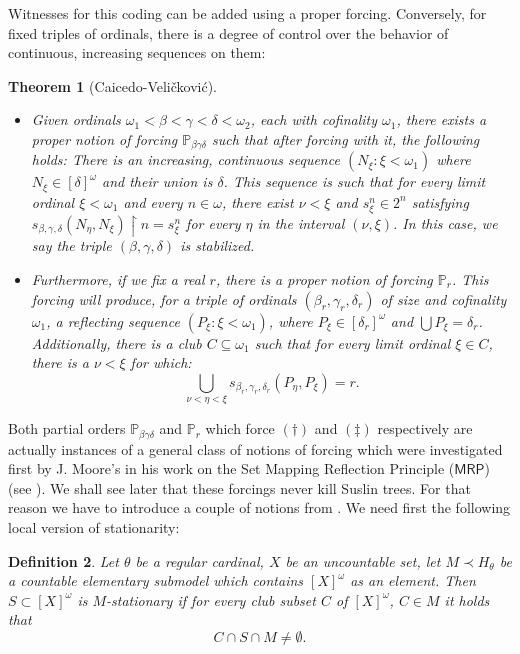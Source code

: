 \documentclass[a4paper,11pt]{article}
\newtheorem{theorem}{Theorem}[section]
\newtheorem{definition}[theorem]{Definition}
\newcommand{\forceP}{\mathbb{P}}
\newcommand{\MRP}{\mathsf{MRP}}
\begin{document}
Witnesses for this coding can be added using a proper forcing. Conversely, for fixed triples of ordinals, there is a degree of control over the behavior of continuous, increasing sequences on them:

\begin{theorem}[Caicedo-Veli\v{c}kovi\'{c}]
\begin{itemize}
\item[$(\dagger)$] Given ordinals $\omega_1 < \beta < \gamma < \delta < \omega_2$, each with cofinality $\omega_1$, there exists a proper notion of forcing $\forceP_{\beta \gamma \delta}$ such that after forcing with it, the following holds: There is an increasing, continuous sequence $(N_{\xi} : \xi < \omega_1)$ where $N_{\xi} \in [\delta]^{\omega}$ and their union is $\delta$. This sequence is such that for every limit ordinal $\xi < \omega_1$ and every $n \in \omega$, there exist $\nu < \xi$ and $s_{\xi}^n \in 2^n$ satisfying $s_{\beta, \gamma, \delta}(N_{\eta}, N_{\xi}) \restriction n = s_{\xi}^{n}$ for every $\eta$ in the interval $(\nu, \xi)$. In this case, we say the triple $(\beta, \gamma, \delta)$ is stabilized.

\item[$(\ddagger)$] Furthermore, if we fix a real $r$, there is a proper notion of forcing $\forceP_r$. This forcing will produce, for a triple of ordinals $(\beta_r, \gamma_r, \delta_r)$ of size and cofinality $\omega_1$, a reflecting sequence $(P_{\xi} : \xi < \omega_1)$, where $P_{\xi} \in [\delta_r]^{\omega}$ and $\bigcup P_{\xi} = \delta_r$. Additionally, there is a club $C \subseteq \omega_1$ such that for every limit ordinal $\xi \in C$, there is a $\nu < \xi$ for which:
    $$\bigcup_{\nu < \eta < \xi} s_{\beta_r, \gamma_r, \delta_r} (P_{\eta}, P_{\xi}) = r.$$
\end{itemize}
\end{theorem}

Both partial orders $\forceP_{\beta \gamma \delta}$ and $\forceP_{r}$ which force $(\dagger)$ and $(\ddagger)$ respectively are actually instances of a general class of notions of forcing which were investigated first by J. Moore's in his work on the Set Mapping Reflection Principle ($\MRP$) (see \cite{Moore}). We shall see later that these forcings never kill Suslin trees. For that reason we have to introduce a couple of notions from \cite{Moore}.
We need first the following local version of stationarity: 
\begin{definition}
Let $\theta$ be a regular cardinal, $X$ be an uncountable set, let $M \prec H_{\theta}$ be a countable 
elementary submodel which contains $[X]^{\omega}$ as an element. Then $S \subset [X]^{\omega}$ is $M$-stationary if 
for every club subset $C$ of $[X]^{\omega}$, $C \in M$ it holds that $$C \cap S \cap M \ne \emptyset.$$
\end{definition}
\end{document}
